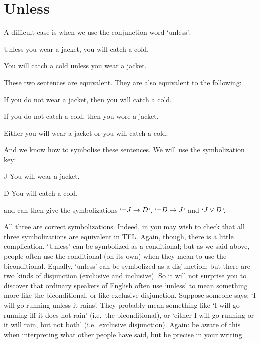 \section{Unless}
A difficult case is when we use the conjunction word `unless':

\begin{earg}
\item[\ex{unless1}] Unless you wear a jacket, you will catch a cold.
\item[\ex{unless2}] You will catch a cold unless you wear a jacket.
\end{earg}
These two sentences are equivalent. They are also equivalent to the following:
\begin{earg}
\item[\ex{unless3}]  If you do not wear a jacket, then you will catch a cold.
\item[\ex{unless4}]  If you do not catch a cold, then you wore a jacket.
\item [\ex{unless5}] Either you will wear a jacket or you will catch a cold.
\end{earg}
And we know how to symbolise these sentences. We will use the symbolization key:
	\begin{ekey}
		\item[J] You will wear a jacket.
		\item[D] You will catch a cold.
	\end{ekey} and can then give the symbolizations `$\neg J \rightarrow D$', `$\neg D \rightarrow J$' and `$J \vee D$'.

All three are correct symbolizations. Indeed, in you may wish to check that all three symbolizations are equivalent in TFL.
Again, though, there is a little complication. `Unless' can be symbolized as a conditional; but as we said above, people often use the conditional (on its own) when they mean to use the biconditional. Equally, `unless' can be symbolized as a disjunction; but there are two kinds of disjunction (exclusive and inclusive). So it will not surprise you to discover that ordinary speakers of English often use `unless' to mean something more like the biconditional, or like exclusive disjunction. Suppose someone says: `I will go running unless it rains'. They probably mean something like `I will go running iff it does not rain' (i.e.\ the biconditional), or  `either I will go running or it will rain, but not both' (i.e.\ exclusive disjunction). Again: be aware of this when interpreting what other people have said, but be precise in your writing.

